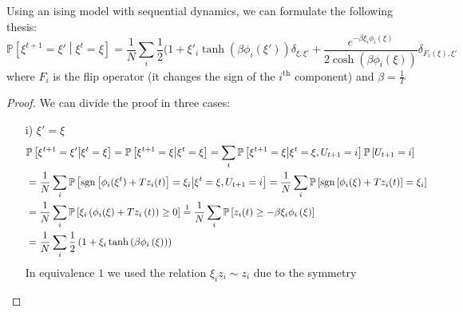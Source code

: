 \begin{lemma}
    \label{lemma:stoch_der}
    Using an ising model with sequential dynamics, we can formulate the following thesis:
    \[
        \mathbb{P}\left[\xi^{t+1}=\xi'\middle|\xi^t=\xi\right] =
        \frac{1}{N}\sum_i \frac{1}{2} (1 + \xi'_i \tanh(\beta \phi_i(\xi' )) \delta_{\xi,\xi'} + \frac{e^{-\beta \xi_i \phi_i(\xi)}}{2\cosh(\beta\phi_i(\xi))} \delta_{F_i(\xi),\xi'}
    \]
    where $F_i $ is the flip operator (it changes the sign of the $i^{\text{th}}$ component) and $\beta = \frac{1}{T}$
    \begin{proof}
    We can divide the proof in three cases:
    \begin{itemize}
        \item[i)] $\xi' = \xi$
        \begin{align*}
            &\mathbb{P}\left[\xi^{t+1}=\xi'\middle|\xi^t=\xi\right]
            = \mathbb{P}\left[\xi^{t+1}=\xi\middle|\xi^t=\xi\right]
            = \sum_i \mathbb{P}\left[\xi^{t+1}=\xi\middle|\xi^t=\xi, U_{t+1}=i\right]\mathbb{P}\left[U_{t+1}=i\right] \\
            &= \frac1N \sum_i \mathbb{P}\left[ \operatorname{sgn}\left[\phi_i(\xi^t) + Tz_i(t) \right] = \xi_i\middle|\xi^t=\xi, U_{t+1}=i\right]
            = \frac1N \sum_i \mathbb{P}\left[ \operatorname{sgn}\left[\phi_i(\xi) + Tz_i(t) \right] = \xi_i\right] \\
            &= \frac1N \sum_i \mathbb{P}\left[ \xi_i\left(\phi_i(\xi) + Tz_i\left(t\right) \right) \geq 0 \right]
            \overset{1}{=} \frac1N \sum_i \mathbb{P}\left[z_i(t) \geq - \beta \xi_i \phi_i\left(\xi\right) \right] \\
            &= \frac1N \sum_i \frac12 \left(1 + \xi_i \tanh\left(\beta \phi_i\left(\xi\right)\right)\right)
        \end{align*}
        In equivalence $1$ we used the relation $\xi_i z_i \sim z_i$ due to the symmetry


\end{itemize}
\end{proof}
\end{lemma}
